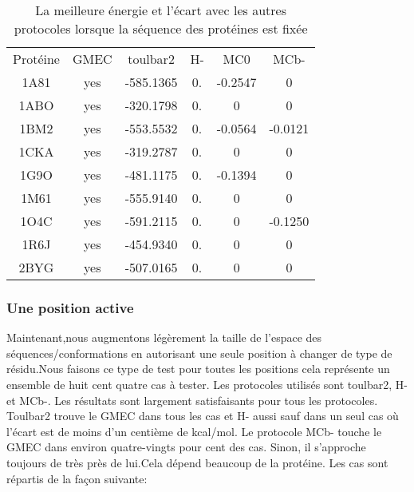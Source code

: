     \begin{table}[h]
      \centering

      \begin{tabular}{cccccc}

        \toprule
        Protéine & GMEC & toulbar2 & H- & MC0 & MCb- \\
        \cmidrule{1-6}
        1A81 & yes & -585.1365 & 0. & -0.2547 & 0 \\
        1ABO & yes & -320.1798 & 0. & 0 & 0 \\
        1BM2 & yes & -553.5532 & 0. & -0.0564 & -0.0121 \\
        1CKA & yes & -319.2787 & 0. & 0 & 0 \\
        1G9O & yes & -481.1175 & 0. & -0.1394 & 0 \\
        1M61 & yes & -555.9140 & 0. & 0 & 0 \\
        1O4C & yes & -591.2115 & 0. & 0 & -0.1250 \\
        1R6J & yes & -454.9340 & 0. & 0 & 0 \\
        2BYG & yes & -507.0165 & 0. & 0 & 0 \\        
        \bottomrule


      \end{tabular}      
      \caption{La meilleure énergie et l'écart avec les autres protocoles lorsque la séquence des protéines est fixée}
\label{tab:result_no_active}      
    \end{table}

   \subsubsection{Une position active}

Maintenant,nous augmentons légèrement la taille de l'espace des séquences/conformations en autorisant une seule position à changer de type de résidu.Nous faisons ce type de test pour toutes les positions cela représente un ensemble de huit cent quatre cas à tester. Les protocoles utilisés sont toulbar2, H- et MCb-. Les résultats sont largement satisfaisants pour tous les protocoles. Toulbar2 trouve le GMEC dans tous les cas et H- aussi sauf dans un seul cas où l'écart est de moins d'un centième de kcal/mol. Le protocole MCb- touche le GMEC dans environ quatre-vingts pour cent des cas. Sinon, il s'approche toujours de très près de lui.Cela dépend beaucoup de la protéine. Les cas sont répartis de la façon suivante:  

